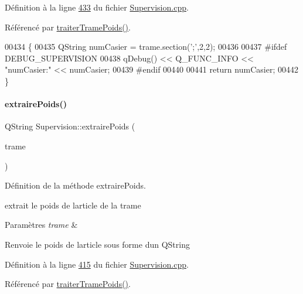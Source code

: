 Définition à la ligne \hyperlink{_supervision_8cpp_source_l00433}{433} du fichier \hyperlink{_supervision_8cpp_source}{Supervision.\+cpp}.



Référencé par \hyperlink{_supervision_8cpp_source_l00370}{traiter\+Trame\+Poids()}.


\begin{DoxyCode}
00434 \{
00435     QString numCasier = trame.section(\textcolor{charliteral}{';'},2,2);
00436 
00437 \textcolor{preprocessor}{    #ifdef DEBUG\_SUPERVISION}
00438         qDebug() << Q\_FUNC\_INFO << \textcolor{stringliteral}{"numCasier:"} << numCasier;
00439 \textcolor{preprocessor}{    #endif}
00440 
00441     \textcolor{keywordflow}{return} numCasier;
00442 \}
\end{DoxyCode}
\mbox{\label{class_supervision_afdef41cd85f2ecfae9d1dc46f556a034}} 
\paragraph{\texorpdfstring{extraire\+Poids()}{extrairePoids()}}
{\footnotesize\ttfamily Q\+String Supervision\+::extraire\+Poids (\begin{DoxyParamCaption}\item[{Q\+String}]{trame }\end{DoxyParamCaption})\hspace{0.3cm}{\ttfamily [private]}}



Définition de la méthode extraire\+Poids. 

extrait le poids de l\textquotesingle{}article de la trame 
\begin{DoxyParams}{Paramètres}
{\em trame} & \\
\hline
\end{DoxyParams}
\begin{DoxyReturn}{Renvoie}
le poids de l\textquotesingle{}article sous forme d\textquotesingle{}un Q\+String 
\end{DoxyReturn}


Définition à la ligne \hyperlink{_supervision_8cpp_source_l00415}{415} du fichier \hyperlink{_supervision_8cpp_source}{Supervision.\+cpp}.



Référencé par \hyperlink{_supervision_8cpp_source_l00370}{traiter\+Trame\+Poids()}.


